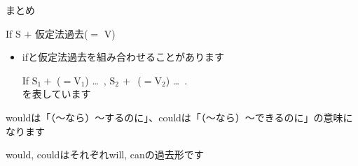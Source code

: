 \documentclass[aspectratio=169,xcolor={dvipsnames,table}]{beamer}
\begin{document}
\begin{frame}[plain]{まとめ}
 \begin{block}{If S $+$ 仮定法過去($=$ V)}
\small
\begin{itemize}[square]
 \item ifと仮定法過去を組み合わせることがあります\par

If $\text{S}_{1} +$ ($= \text{V}_{1}$) \ldots\,\,\,,\hspace{10pt}
 $\text{S}_{2}\,+$ \,($=\text{V}_{2}$) \ldots\,\,\,.\\[10pt]
\hfill{}を表しています
\end{itemize}

\hfill{\scriptsize wouldは「（～なら）～するのに」、couldは「（～なら）～できるのに」の意味になります}

\hfill{\scriptsize would, couldはそれぞれwill, canの過去形です}

 

\end{block}
\end{frame}
\end{document}
